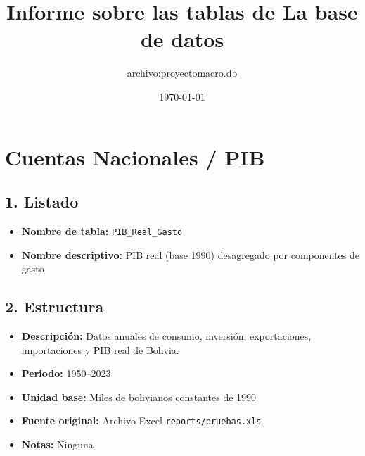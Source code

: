 \documentclass[12pt,a4paper]{article}
\title{Informe sobre las tablas de La base de datos}
\author{archivo:proyectomacro.db}
\date{\today}
\begin{document}
\maketitle
\tableofcontents
\newpage

\section{Cuentas Nacionales / PIB}


\subsection*{1. Listado}
\begin{itemize}
  \item \textbf{Nombre de tabla:} \texttt{PIB\_Real\_Gasto}
  \item \textbf{Nombre descriptivo:} PIB real (base 1990) desagregado por componentes de gasto
\end{itemize}

\subsection*{2. Estructura}
\begin{itemize}
  \item \textbf{Descripción:} Datos anuales de consumo, inversión, exportaciones, importaciones y PIB real de Bolivia.
  \item \textbf{Periodo:} 1950--2023
  \item \textbf{Unidad base:} Miles de bolivianos constantes de 1990
  \item \textbf{Fuente original:} Archivo Excel \texttt{reports/pruebas.xls}
  \item \textbf{Notas:} Ninguna
\end{itemize}
\end{document}
